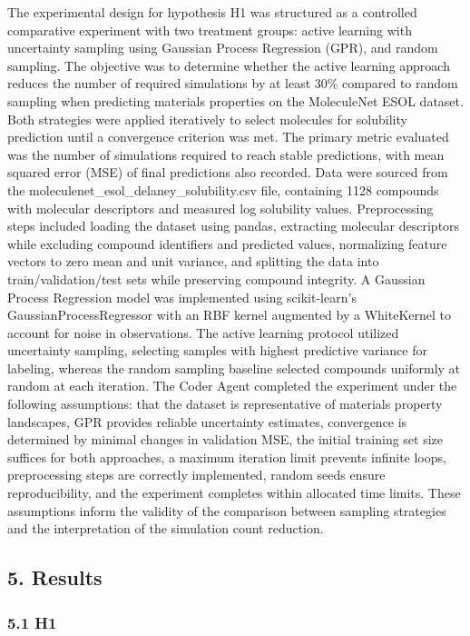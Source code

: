The experimental design for hypothesis H1 was structured as a controlled comparative experiment with two treatment groups: active learning with uncertainty sampling using Gaussian Process Regression (GPR), and random sampling. The objective was to determine whether the active learning approach reduces the number of required simulations by at least 30\% compared to random sampling when predicting materials properties on the MoleculeNet ESOL dataset. Both strategies were applied iteratively to select molecules for solubility prediction until a convergence criterion was met. The primary metric evaluated was the number of simulations required to reach stable predictions, with mean squared error (MSE) of final predictions also recorded. Data were sourced from the moleculenet\_esol\_delaney\_solubility.csv file, containing 1128 compounds with molecular descriptors and measured log solubility values. Preprocessing steps included loading the dataset using pandas, extracting molecular descriptors while excluding compound identifiers and predicted values, normalizing feature vectors to zero mean and unit variance, and splitting the data into train/validation/test sets while preserving compound integrity. A Gaussian Process Regression model was implemented using scikit-learn's GaussianProcessRegressor with an RBF kernel augmented by a WhiteKernel to account for noise in observations. The active learning protocol utilized uncertainty sampling, selecting samples with highest predictive variance for labeling, whereas the random sampling baseline selected compounds uniformly at random at each iteration. The Coder Agent completed the experiment under the following assumptions: that the dataset is representative of materials property landscapes, GPR provides reliable uncertainty estimates, convergence is determined by minimal changes in validation MSE, the initial training set size suffices for both approaches, a maximum iteration limit prevents infinite loops, preprocessing steps are correctly implemented, random seeds ensure reproducibility, and the experiment completes within allocated time limits. These assumptions inform the validity of the comparison between sampling strategies and the interpretation of the simulation count reduction.

\subsection*{5. Results}

\subsubsection*{5.1 H1}

